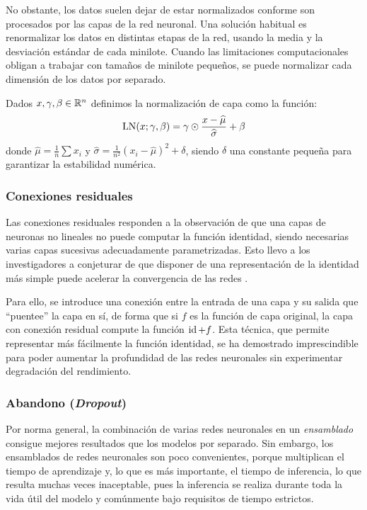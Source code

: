 No obstante, los datos suelen dejar de estar normalizados conforme son procesados por las capas de la red neuronal. Una solución habitual es renormalizar los datos en distintas etapas de la red, usando la media y la desviación estándar de cada minilote. Cuando las limitaciones computacionales obligan a trabajar con tamaños de minilote pequeños, se puede normalizar cada dimensión de los datos por separado. 

\begin{definition}
    Dados \( x, \gamma, \beta \in \mathbb{R}^{n} \) definimos la normalización de capa como la función:
    \[
        \operatorname{LN}(x; \gamma, \beta) = \gamma \odot \frac{x - \widehat{\mu}}{\widehat{\sigma}} + \beta
    \]
    donde \( \widehat{\mu} = \frac{1}{n} \sum x_i \) y \( \widehat{\sigma} = \frac{1}{n^2} (x_i - \widehat{\mu})^2 + \delta \), siendo \( \delta \) una constante pequeña para garantizar la estabilidad numérica.
\end{definition}

\subsubsection{Conexiones residuales}
Las conexiones residuales responden a la observación de que una capas de neuronas no lineales no puede computar la función identidad, siendo necesarias varias capas sucesivas  adecuadamente parametrizadas. Esto llevo a los investigadores a conjeturar de que disponer de una representación de la identidad más simple puede acelerar la convergencia de las redes \cite{he2016deep}.

Para ello, se introduce una conexión entre la entrada de una capa y su salida que ``puentee'' la capa en sí, de forma que si \( f \) es la función de capa original, la capa con conexión residual compute la función \( \operatorname{id} + f \). Esta técnica, que permite representar más fácilmente la función identidad, se ha demostrado imprescindible para poder aumentar la profundidad de las redes neuronales sin experimentar degradación del rendimiento.

\subsubsection{Abandono (\textit{Dropout})}
Por norma general, la combinación de varias redes neuronales en un \textit{ensamblado} consigue mejores resultados que los modelos por separado. Sin embargo, los ensamblados de redes neuronales son poco convenientes, porque multiplican el tiempo de aprendizaje y, lo que es más importante, el tiempo de inferencia, lo que resulta muchas veces inaceptable, pues la inferencia se realiza durante toda la vida útil del modelo y comúnmente bajo requisitos de tiempo estrictos.

